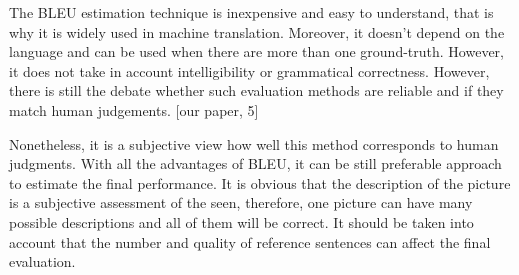 \documentclass[a4paper,UKenglish,cleveref, autoref, thm-restate]{lipics-v2021}
\begin{document}
The BLEU estimation technique is inexpensive and easy to understand, that is why it is widely used in machine translation. Moreover, it doesn't depend on the language and can be used when there are more than one ground-truth. However, it does not take in account intelligibility or grammatical correctness. However, there is still the debate whether such evaluation methods are reliable and if they match human judgements. [our paper, 5]

Nonetheless, it is a subjective view how well this method corresponds to human judgments. With all the advantages of BLEU, it can be still preferable approach to estimate the final performance.
It is obvious that the description of the picture is a subjective assessment of the seen, therefore, one picture can have many possible descriptions and all of them will be correct. It should be taken into account that the number and quality of reference sentences can affect the final evaluation.
\end{document}
